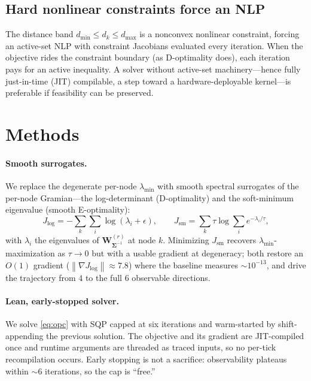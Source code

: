 \documentclass[11pt]{article}
\newcommand{\norm}[1]{\left\lVert#1\right\rVert}
\newcommand{\Wstlog}{\bm{W}^{(r)}_{\bm{\Sigma}^{-1}}}
\begin{document}
\subsection{Hard nonlinear constraints force an NLP}\label{sub:p4}
The distance band $d_{\min}\le d_k\le d_{\max}$ is a nonconvex nonlinear constraint, forcing an
active-set NLP with constraint Jacobians evaluated every iteration. When the objective rides the
constraint boundary (as D-optimality does), each iteration pays for an active inequality. A solver
without active-set machinery---hence fully just-in-time (JIT) compilable, a step toward a
hardware-deployable kernel---is preferable if feasibility can be preserved.

\section{Methods}\label{sec:methods}

\paragraph{Smooth surrogates.} We replace the degenerate per-node $\lambda_{\min}$ with smooth
spectral surrogates of the per-node Gramian---the log-determinant (D-optimality) and the
soft-minimum eigenvalue (smooth E-optimality):
\begin{equation}\label{eq:surrogates}
  J_{\log} = -\sum_{k}\sum_{i} \log(\lambda_i + \epsilon),
  \qquad
  J_{\mathrm{sm}} = \sum_{k} \tau\log\sum_{i} e^{-\lambda_i/\tau},
\end{equation}
with $\lambda_i$ the eigenvalues of $\Wstlog$ at node $k$. Minimizing $J_{\mathrm{sm}}$ recovers
$\lambda_{\min}$-maximization as $\tau\!\to\!0$ but with a usable gradient at degeneracy; both
restore an $O(1)$ gradient ($\norm{\nabla J_{\log}}\approx 7.8$) where the baseline measures
$\sim\!10^{-13}$, and drive the trajectory from $4$ to the full $6$ observable directions.

\paragraph{Lean, early-stopped solver.} We solve \eqref{eq:opc} with SQP capped at six iterations
and warm-started by shift-appending the previous solution. The objective and its gradient are
JIT-compiled once and runtime arguments are threaded as traced inputs, so no per-tick
recompilation occurs. Early stopping is not a sacrifice: observability plateaus within $\sim\!6$
iterations, so the cap is ``free.''
\end{document}
